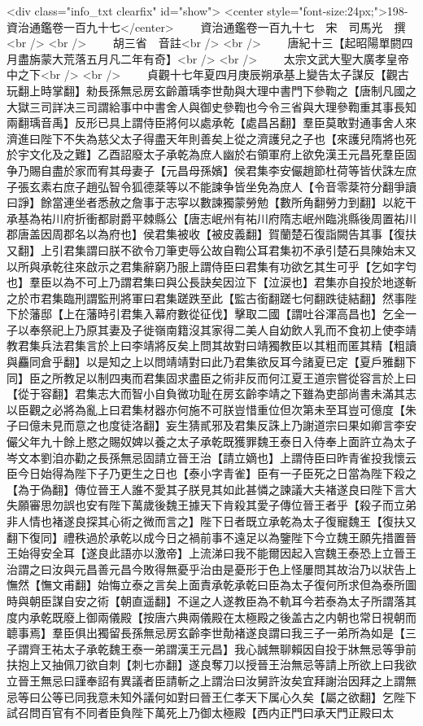 <div class="info_txt clearfix" id="show">
<center style="font-size:24px;">198-資治通鑑卷一百九十七</center>
  　　資治通鑑卷一百九十七　宋　司馬光　撰<br />
<br />
　　胡三省　音註<br />
<br />
　　唐紀十三【起昭陽單閼四月盡旃蒙大荒落五月凡二年有奇】<br />
<br />
　　太宗文武大聖大廣孝皇帝中之下<br />
<br />
　　貞觀十七年夏四月庚辰朔承基上變告太子謀反【觀古玩翻上時掌翻】勑長孫無忌房玄齡蕭瑀李世勣與大理中書門下參鞫之【唐制凡國之大獄三司詳决三司謂給事中中書舍人與御史參鞫也今令三省與大理參鞫重其事長知兩翻瑀音禹】反形已具上謂侍臣將何以處承乾【處昌呂翻】羣臣莫敢對通事舍人來濟進曰陛下不失為慈父太子得盡天年則善矣上從之濟護兒之子也【來護兒隋將也死於宇文化及之難】乙酉詔廢太子承乾為庶人幽於右領軍府上欲免漢王元昌死羣臣固争乃賜自盡於家而宥其母妻子【元昌母孫嬪】侯君集李安儼趙節杜荷等皆伏誅左庶子張玄素右庶子趙弘智令狐德棻等以不能諫争皆坐免為庶人【令音零棻符分翻爭讀曰諍】餘當連坐者悉赦之詹事于志寜以數諫獨蒙勞勉【數所角翻勞力到翻】以紇干承基為祐川府折衝都尉爵平棘縣公【唐志岷州有祐川府隋志岷州臨洮縣後周置祐川郡唐盖因周郡名以為府也】侯君集被收【被皮義翻】賀蘭楚石復詣闕告其事【復扶又翻】上引君集謂曰朕不欲令刀筆吏辱公故自鞫公耳君集初不承引楚石具陳始末又以所與承乾往來啟示之君集辭窮乃服上謂侍臣曰君集有功欲乞其生可乎【乞如字匄也】羣臣以為不可上乃謂君集曰與公長訣矣因泣下【泣涙也】君集亦自投於地遂斬之於市君集臨刑謂監刑將軍曰君集蹉跌至此【監古銜翻蹉七何翻跌徒結翻】然事陛下於藩邸【上在藩時引君集入幕府數從征伐】擊取二國【謂吐谷渾高昌也】乞全一子以奉祭祀上乃原其妻及子徙嶺南籍沒其家得二美人自幼飲人乳而不食初上使李靖教君集兵法君集言於上曰李靖將反矣上問其故對曰靖獨教臣以其粗而匿其精【粗讀與麤同倉乎翻】以是知之上以問靖靖對曰此乃君集欲反耳今諸夏已定【夏戶雅翻下同】臣之所教足以制四夷而君集固求盡臣之術非反而何江夏王道宗嘗從容言於上曰【從于容翻】君集志大而智小自負微功耻在房玄齡李靖之下雖為吏部尚書未滿其志以臣觀之必將為亂上曰君集材器亦何施不可朕豈惜重位但次第未至耳豈可億度【朱子曰億未見而意之也度徒洛翻】妄生猜貳邪及君集反誅上乃謝道宗曰果如卿言李安儼父年九十餘上愍之賜奴婢以養之太子承乾既獲罪魏王泰日入侍奉上面許立為太子岑文本劉洎亦勸之長孫無忌固請立晉王治【請立嫡也】上謂侍臣曰昨青雀投我懷云臣今日始得為陛下子乃更生之日也【泰小字青雀】臣有一子臣死之日當為陛下殺之【為于偽翻】傳位晉王人誰不愛其子朕見其如此甚憐之諫議大夫褚遂良曰陛下言大失願審思勿誤也安有陛下萬歲後魏王據天下肯殺其愛子傳位晉王者乎【殺子而立弟非人情也褚遂良探其心術之微而言之】陛下日者既立承乾為太子復寵魏王【復扶又翻下復同】禮秩過於承乾以成今日之禍前事不遠足以為鑒陛下今立魏王願先措置晉王始得安全耳【遂良此語亦以激帝】上流涕曰我不能爾因起入宫魏王泰恐上立晉王治謂之曰汝與元昌善元昌今敗得無憂乎治由是憂形于色上怪屢問其故治乃以狀告上憮然【憮文甫翻】始悔立泰之言矣上面責承乾承乾曰臣為太子復何所求但為泰所圖時與朝臣謀自安之術【朝直遥翻】不逞之人遂教臣為不軌耳今若泰為太子所謂落其度内承乾既廢上御兩儀殿【按唐六典兩儀殿在太極殿之後盖古之内朝也常日視朝而聼事焉】羣臣俱出獨留長孫無忌房玄齡李世勣褚遂良謂曰我三子一弟所為如是【三子謂齊王祐太子承乾魏王泰一弟謂漢王元昌】我心誠無聊賴因自投于牀無忌等爭前扶抱上又抽佩刀欲自刺【刺七亦翻】遂良奪刀以授晉王治無忌等請上所欲上曰我欲立晉王無忌曰謹奉詔有異議者臣請斬之上謂治曰汝舅許汝矣宜拜謝治因拜之上謂無忌等曰公等已同我意未知外議何如對曰晉王仁孝天下属心久矣【屬之欲翻】乞陛下試召問百官有不同者臣負陛下萬死上乃御太極殿【西内正門曰承天門正殿曰太